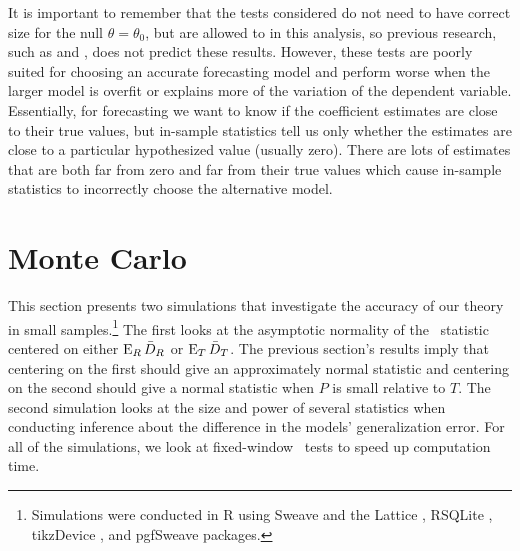 \documentclass[11pt]{article}
\begin{document}
It is important to remember that the tests considered do not need to
have correct size for the null $\theta = \theta_0$, but are allowed to
in this analysis, so previous research, such as \citet{Cal:11c} and
\citet{Ana:12}, does not predict these results.  However, these tests
are poorly suited for choosing an accurate forecasting model and
perform worse when the larger model is overfit or explains more of the
variation of the dependent variable.  Essentially, for forecasting we
want to know if the coefficient estimates are close to their true
values, but in-sample statistics tell us only whether the estimates
are close to a particular hypothesized value (usually zero).  There
are lots of estimates that are both far from zero and far from their
true values which cause in-sample statistics to incorrectly choose the
alternative model.

\section{Monte Carlo}\label{sec:mc}
\newcommand{\thetanorm}{\ensuremath{\lvert \theta \rvert_2}} This
section presents two simulations that investigate the accuracy of our
theory in small samples.\footnote{Simulations were conducted in R
  \citep{Rde:10} using Sweave \citep{Lei:02} and the Lattice
  \citep{Sar:10}, RSQLite \citep{Jam:10}, tikzDevice
  \citep{ShB:11:0.6.1}, and pgfSweave \citep{BrS:11:1.2.1} packages.}
The first looks at the asymptotic normality of the \dmw\ statistic
centered on either $\operatorname{E}_R \bar{D}_{R}$ or $\operatorname{E}_T \bar{D}_{T}$.  The previous
section's results imply that centering on the first should give an
approximately normal statistic and centering on the second should give
a normal statistic when $P$ is small relative to $T$.  The second
simulation looks at the size and power of several statistics when
conducting inference about the difference in the models'
generalization error.  For all of the simulations, we look at
fixed-window \oos\ tests to speed up computation time.
\end{document}

